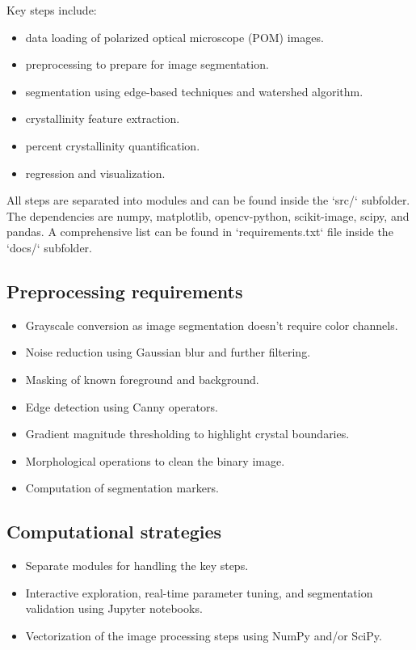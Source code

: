 \documentclass[12pt]{article}
\begin{document}
Key steps include:
\begin{itemize}
    \item data loading of polarized optical microscope (POM) images.
    \item preprocessing to prepare for image segmentation.
    \item segmentation using edge-based techniques and watershed algorithm.
    \item crystallinity feature extraction.
    \item percent crystallinity quantification.
    \item regression and visualization.
    
\end{itemize}

All steps are separated into modules and can be found inside the `src/` subfolder.\\

The dependencies are numpy, matplotlib, opencv-python, scikit-image, scipy, and pandas. A comprehensive list can be found in `requirements.txt` file inside the `docs/` subfolder.

\subsection{Preprocessing requirements}

\begin{itemize}
    \item Grayscale conversion as image segmentation doesn't require color channels.
    \item Noise reduction using Gaussian blur and further filtering.
    \item Masking of known foreground and background.
    \item Edge detection using Canny operators.
    \item Gradient magnitude thresholding to highlight crystal boundaries.
    \item Morphological operations to clean the binary image.
    \item Computation of segmentation markers.
\end{itemize}

\subsection{Computational strategies}
\begin{itemize}
    \item Separate modules for handling the key steps.
    \item Interactive exploration, real-time parameter tuning, and segmentation validation using Jupyter notebooks.
    \item Vectorization of the image processing steps using NumPy and/or SciPy.
\end{itemize}
\end{document}
